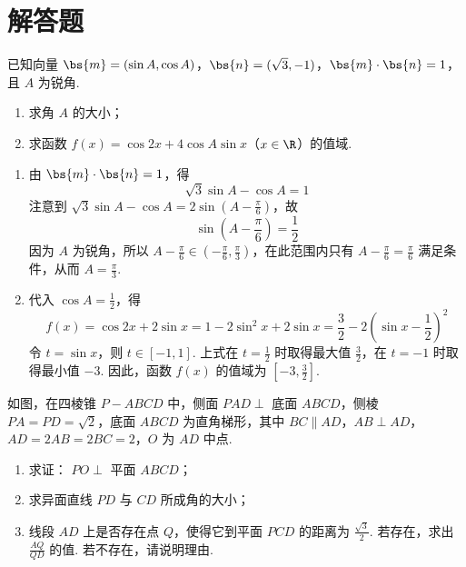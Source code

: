 \section{解答题}

\begin{problem}
已知向量 \(\bs{m} = (\sin A, \cos A)\)，\(\bs{n} = (\sqrt{3}, -1)\)，\(\bs{m} \cdot \bs{n} = 1\)，且 \(A\) 为锐角.
\begin{enumerate}
\item 求角 \(A\) 的大小；
\item 求函数 \( f(x) = \cos 2x + 4 \cos A \sin x \)（\(x \in \R\)）的值域.
\end{enumerate}
\end{problem}

\begin{solution}
\begin{enumerate}
\item 由 \(\bs{m} \cdot \bs{n} = 1\)，得
\[
\sqrt{3}\sin A-\cos A=1
\]
注意到 \(\sqrt{3}\sin A-\cos A=2\sin\left(A-\frac{\pi}{6}\right)\)，故
\[
\sin\left(A-\frac{\pi}{6}\right)=\frac{1}{2}
\]
因为 \(A\) 为锐角，所以 \(A-\frac{\pi}{6}\in\left(-\frac{\pi}{6},\frac{\pi}{3}\right)\)，在此范围内只有 \(A-\frac{\pi}{6}=\frac{\pi}{6}\) 满足条件，从而 \(A=\frac{\pi}{3}\).

\item 代入 \(\cos A=\frac{1}{2}\)，得
\[
f(x)=\cos 2x+2\sin x=1-2\sin^2x+2\sin x=\frac{3}{2}-2\left(\sin x-\frac{1}{2}\right)^2
\]
令 \(t=\sin x\)，则 \(t\in[-1,1]\). 上式在 \(t=\frac{1}{2}\) 时取得最大值 \(\frac{3}{2}\)，在 \(t=-1\) 时取得最小值 \(-3\). 因此，函数 \(f(x)\) 的值域为 \(\left[-3,\frac{3}{2}\right]\).
\end{enumerate}
\end{solution}

\begin{problem}
如图，在四棱锥 \(P - ABCD\) 中，侧面 \(PAD \perp\) 底面 \(ABCD\)，侧棱 \(PA = PD = \sqrt{2}\)，底面 \(ABCD\) 为直角梯形，其中 \(BC \parallel AD\)，\(AB \perp AD\)，\(AD = 2AB = 2BC = 2\)，\(O\) 为 \(AD\) 中点.

\begin{enumerate}
\item 求证： \(PO \perp\) 平面 \(ABCD\)；
\item 求异面直线 \(PD\) 与 \(CD\) 所成角的大小；
\item 线段 \(AD\) 上是否存在点 \(Q\)，使得它到平面 \(PCD\) 的距离为 \(\frac{\sqrt{3}}{2}\). 若存在，求出 \(\frac{AQ}{QD}\) 的值. 若不存在，请说明理由.
\end{enumerate}

\end{problem}

